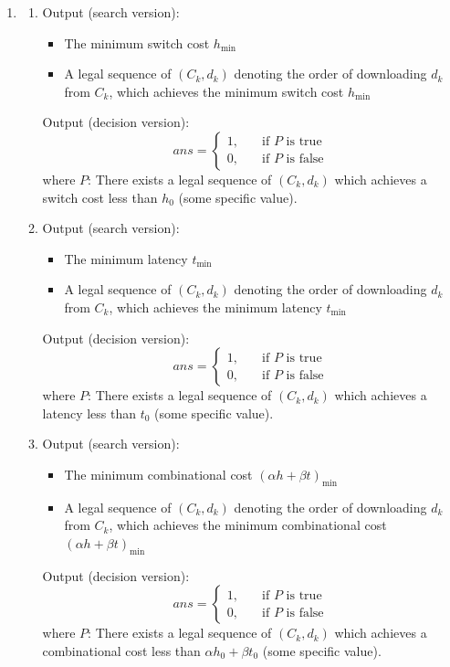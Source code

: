 \documentclass[12pt,a4paper]{article}
\makeatletter
\newtheorem*{solution}{Solution}
\theoremstyle{definition}
\renewenvironment{solution}[1][Solution] {\par\pushQED{\qed}\normalfont\topsep6\p@\@plus6\p@\relax\trivlist\item[\hskip\labelsep\bfseries#1\@addpunct{.}]\ignorespaces}{\popQED\endtrivlist\@endpefalse} \makeatother
\makeatother
\begin{document}
\begin{enumerate}
\begin{solution}
	\begin{enumerate}
		\item
		Output (search version):
		\begin{itemize}
			\item
			The minimum switch cost $h_{\text{min}}$
			\item 
			A legal sequence of $(C_k, d_k)$ denoting the order of downloading $d_k$ from $C_k$, which achieves the minimum switch cost $h_{\text{min}}$
		\end{itemize}
		Output (decision version):
		\[
			ans = 
			\begin{cases}
				1, \quad & \text{if } P \text{ is true} \\
				0, \quad & \text{if } P \text{ is false}
			\end{cases}
		\]
		where $P$: There exists a legal sequence of $(C_k, d_k)$ which achieves a switch cost less than $h_0$ (some specific value).
		\item
		Output (search version):
		\begin{itemize}
			\item
			The minimum latency $t_{\text{min}}$
			\item 
			A legal sequence of $(C_k, d_k)$ denoting the order of downloading $d_k$ from $C_k$, which achieves the minimum latency $t_{\text{min}}$
		\end{itemize}
		Output (decision version):
		\[
		ans = 
		\begin{cases}
		1, \quad & \text{if } P \text{ is true} \\
		0, \quad & \text{if } P \text{ is false}
		\end{cases}
		\]
		where $P$: There exists a legal sequence of $(C_k, d_k)$ which achieves a latency less than $t_0$ (some specific value).
		\item
		Output (search version):
		\begin{itemize}
			\item
			The minimum combinational cost $(\alpha h + \beta t)_{\text{min}}$
			\item 
			A legal sequence of $(C_k, d_k)$ denoting the order of downloading $d_k$ from $C_k$, which achieves the minimum combinational cost $(\alpha h + \beta t)_{\text{min}}$
		\end{itemize}
		Output (decision version):
		\[
		ans = 
		\begin{cases}
		1, \quad & \text{if } P \text{ is true} \\
		0, \quad & \text{if } P \text{ is false}
		\end{cases}
		\]
		where $P$: There exists a legal sequence of $(C_k, d_k)$ which achieves a combinational cost less than $\alpha h_0 + \beta t_0$ (some specific value).
	\end{enumerate}
\end{solution}

\end{enumerate}

\end{document}
